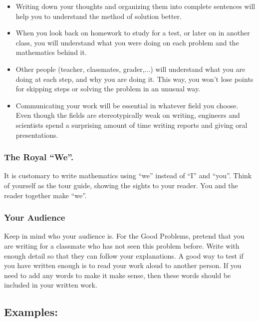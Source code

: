 \begin{itemize}
\item Writing down your thoughts and organizing them into complete
  sentences will help you to understand the method of solution better.
  
\item When you look back on homework to study for a test, or later on
  in another class, you will understand what you
  were doing on each problem and the mathematics behind it.
  
\item Other people (teacher, classmates, grader,...) will understand
  what you are doing at each step, and why you are doing it.  This
  way, you won't lose points for skipping steps or solving the problem
  in an unusual way.
  
\item Communicating your work will be essential in whatever field you choose.
  Even though the fields are stereotypically weak on
  writing, engineers and scientists spend a surprising amount of time
  writing reports and giving oral presentations.
\end{itemize}

\subsubsection*{The Royal ``We''.}

It is customary to write mathematics using ``we'' instead of ``I'' and
``you''. Think of yourself as the tour guide, showing the sights to
your reader. You and the reader together make ``we''.


\subsubsection*{Your Audience}
Keep in mind who your audience is. For the Good Problems, pretend that
you are writing for a classmate who has not seen this problem
before. Write with enough detail so that they can follow your
explanations.  A good way to test if you have written enough is to read
your work aloud to another person. If you need to add any words to
make it make sense, then these words should be included in your
written work.



\secondpage
\subsection*{{Examples:}}

